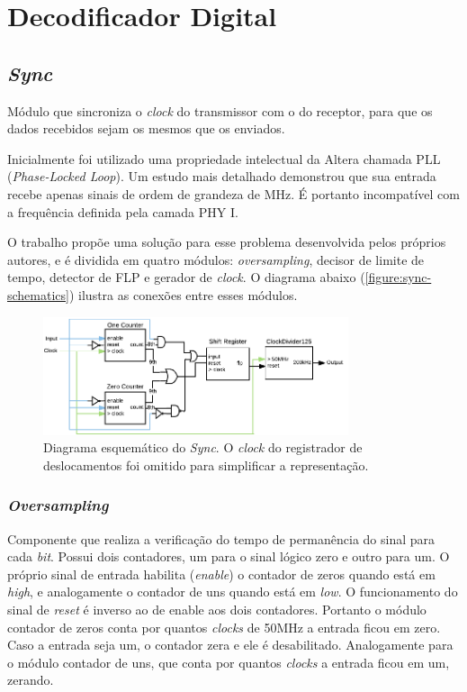 	\section{Decodificador Digital}

	\subsection{\textit{Sync}}

	Módulo que sincroniza o \textit{clock} do transmissor com o do receptor, para que os dados recebidos sejam os mesmos que os enviados.

	Inicialmente foi utilizado uma propriedade intelectual da Altera chamada PLL (\textit{Phase-Locked Loop}). Um estudo mais detalhado demonstrou que sua entrada recebe apenas sinais de ordem de grandeza de MHz. É portanto incompatível com a frequência definida pela camada PHY I.

	O trabalho propõe uma solução para esse problema desenvolvida pelos próprios autores, e é dividida em quatro módulos: \textit{oversampling}, decisor de limite de tempo, detector de FLP e gerador de \textit{clock}. O diagrama abaixo (\autoref{figure:sync-schematics}) ilustra as conexões entre esses módulos.
	\begin{figure}[h]
		\caption{\label{figure:sync-schematics}Diagrama esquemático do \textit{Sync}. O \textit{clock} do registrador de deslocamentos foi omitido para simplificar a representação.}
		\centering
		\includegraphics[width=0.8\textwidth]{sync/schematics.pdf}
	\end{figure}

	\subsubsection{\textit{Oversampling}}
	Componente que realiza a verificação do tempo de permanência do sinal para cada \textit{bit}. Possui dois contadores, um para o sinal lógico zero e outro para um. O próprio sinal de entrada habilita (\textit{enable}) o contador de zeros quando está em \textit{high}, e analogamente o contador de uns quando está em \textit{low}. O funcionamento do sinal de \textit{reset} é inverso ao de enable aos dois contadores. Portanto o módulo contador de zeros conta por quantos \textit{clocks} de 50MHz a entrada ficou em zero. Caso a entrada seja um, o contador zera e ele é desabilitado. Analogamente para o módulo contador de uns, que conta por quantos \textit{clocks} a entrada ficou em um, zerando.

